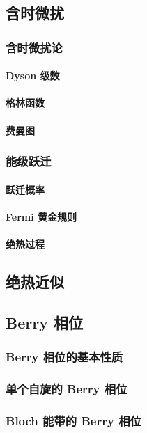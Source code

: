 \documentclass[../../main.tex]{subfiles}
\begin{document}
\subsection{含时微扰}
\subsubsection{含时微扰论}
\paragraph{Dyson 级数}
\paragraph{格林函数}
\paragraph{费曼图}
\subsubsection{能级跃迁}
\paragraph{跃迁概率}
\paragraph{Fermi 黄金规则}
\paragraph{绝热过程}

\subsection{绝热近似}

\subsection{Berry 相位}
\subsubsection{Berry 相位的基本性质}
\subsubsection{单个自旋的 Berry 相位}
\subsubsection{Bloch 能带的 Berry 相位}
\end{document}
